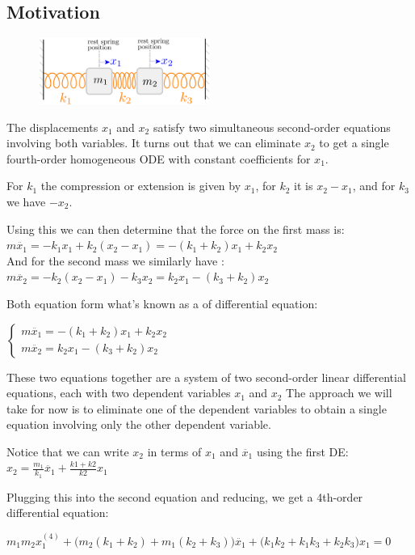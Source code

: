 \documentclass[11pt, openright]{book}
\begin{document}
\subsection{Motivation}

\begin{figure}[ht]
    \centering
    \includegraphics[width=0.5\textwidth]{documents/l7/springs.png}
\end{figure}

The displacements $x_1$ and $x_2$ satisfy two simultaneous second-order equations involving both variables. It turns out that we can eliminate $x_2$ to get a single fourth-order homogeneous ODE with constant coefficients for $x_1$.

For $k_1$ the compression or extension is given by $x_1$, for $k_2$ it is $x_2-x_1$, and for $k_3$ we have $-x_2$.

Using this we can then determine that the force on the first mass is: $m\ddot{x_1}=-k_1x_1+k_2(x_2-x_1)= -(k_1+k_2)x_1+k_2x_2$\\
And for the second mass we similarly have : $m\ddot{x_2}=-k_2(x_2-x_1)-k_3x_2=k_2x_1-(k_3+k_2)x_2$

Both equation form what's known as a  of differential equation:\\
\centerline{$\begin{cases}
            m\ddot{x_1}= -(k_1+k_2)x_1+k_2x_2 \\
            m\ddot{x_2}=k_2x_1-(k_3+k_2)x_2
        \end{cases}$}

These two equations together are a system of two second-order linear differential equations, each with two dependent
variables $x_1$ and $x_2$ The approach we will take for now is to eliminate one of the dependent variables to obtain a single equation involving only the other dependent variable.

Notice that we can write $x_2$ in terms of $x_1$ and $\ddot{x_1}$ using the first DE: $x_2=\frac{m_1}{k_1}\ddot{x_1}+\frac{k1+k2}{k2}x_1$

Plugging this into the second equation and reducing, we get a 4th-order differential equation:\\
\centerline{\large$\boxed{m_1m_2x_1^{(4)}+\big(m_2(k_1+k_2)+m_1(k_2+k_3)\big)\ddot{x_1}+\big(k_1k_2+k_1k_3+k_2k_3\big)x_1=0}$}
\end{document}
